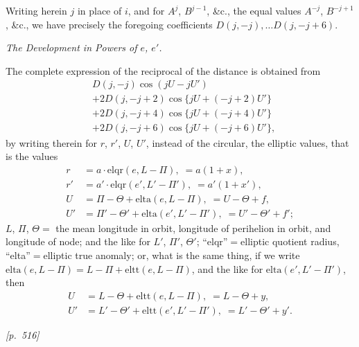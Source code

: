 \documentclass[11pt]{article}
\begin{document}
Writing herein $j$ in place of $i$, and for $A^j$, $B^{j-1}$, \&c., the
equal values $A^{-j}$, $B^{-j+1}$, \&c., we have precisely the foregoing
coefficients $D(j,-j),\ldots D(j,-j+6)$.

\medskip

\begin{center}
\textit{The Development in Powers of $e$, $e'$.}
\end{center}

\medskip

The complete expression of the reciprocal of the distance is obtained from
\[
\begin{aligned}
&D(j,-j)\cos(jU-jU')\\
&+2D(j,-j+2)\cos\{jU+(-j+2)U'\}\\
&+2D(j,-j+4)\cos\{jU+(-j+4)U'\}\\
&+2D(j,-j+6)\cos\{jU+(-j+6)U'\},
\end{aligned}
\]
by writing therein for $r$, $r'$, $U$, $U'$, instead of the circular, the
elliptic values, that is the values
\[
\begin{aligned}
r&=a\cdot\mathrm{elqr}(e,L-\Pi),\;=a(1+x),\\
r'&=a'\cdot\mathrm{elqr}(e',L'-\Pi'),\;=a'(1+x'),\\
U&=\Pi-\Theta+\mathrm{elta}(e,L-\Pi),\;=U-\Theta+f,\\
U'&=\Pi'-\Theta'+\mathrm{elta}(e',L'-\Pi'),\;=U'-\Theta'+f';
\end{aligned}
\]
$L$, $\Pi$, $\Theta=$ the mean longitude in orbit, longitude of perihelion
in orbit, and longitude of node; and the like for $L'$, $\Pi'$, $\Theta'$;
``elqr''$=$elliptic quotient radius, ``elta''$=$elliptic true anomaly; or,
what is the same thing, if we write $\mathrm{elta}(e,L-\Pi)=L-\Pi+\mathrm{eltt}(e,L-\Pi)$,
and the like for $\mathrm{elta}(e',L'-\Pi')$, then
\[
\begin{aligned}
U&=L-\Theta+\mathrm{eltt}(e,L-\Pi),\;=L-\Theta+y,\\
U'&=L'-\Theta'+\mathrm{eltt}(e',L'-\Pi'),\;=L'-\Theta'+y'.
\end{aligned}
\]


\bigskip
\noindent\textit{[p.~516]}

\medskip
\end{document}

